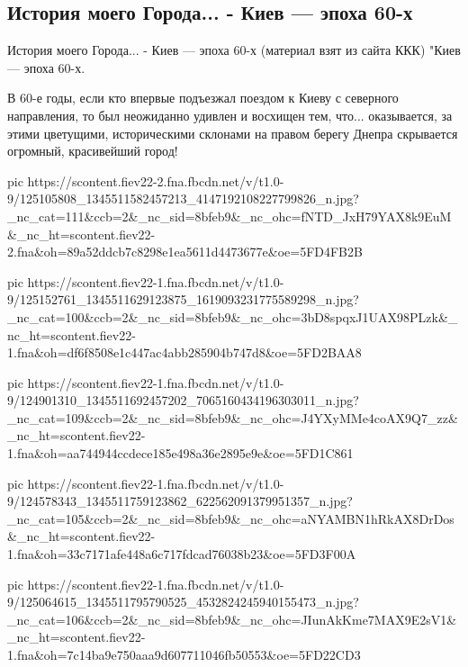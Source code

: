  
 
 

\subsection{История моего Города... - Киев --- эпоха 60-х}
\label{sec:12_11_2020.fb.evgeniy_maslov.1.kiev}


История моего Города... - Киев --- эпоха 60-х
(материал взят из сайта ККК)
"Киев --- эпоха 60-х.

В 60-е годы, если кто впервые подъезжал поездом к Киеву с северного
направления, то был неожиданно удивлен и восхищен тем, что... оказывается, за
этими цветущими, историческими склонами на правом берегу Днепра скрывается
огромный, красивейший город!

\ifcmt
pic https://scontent.fiev22-2.fna.fbcdn.net/v/t1.0-9/125105808_1345511582457213_4147192108227799826_n.jpg?_nc_cat=111&ccb=2&_nc_sid=8bfeb9&_nc_ohc=fNTD_JxH79YAX8k9EuM&_nc_ht=scontent.fiev22-2.fna&oh=89a52ddcb7c8298e1ea5611d4473677e&oe=5FD4FB2B

pic https://scontent.fiev22-1.fna.fbcdn.net/v/t1.0-9/125152761_1345511629123875_1619093231775589298_n.jpg?_nc_cat=100&ccb=2&_nc_sid=8bfeb9&_nc_ohc=3bD8spqxJ1UAX98PLzk&_nc_ht=scontent.fiev22-1.fna&oh=df6f8508e1c447ac4abb285904b747d8&oe=5FD2BAA8

pic https://scontent.fiev22-1.fna.fbcdn.net/v/t1.0-9/124901310_1345511692457202_7065160434196303011_n.jpg?_nc_cat=109&ccb=2&_nc_sid=8bfeb9&_nc_ohc=J4YXyMMe4coAX9Q7_zz&_nc_ht=scontent.fiev22-1.fna&oh=aa744944ccdece185e498a36e2895e9e&oe=5FD1C861

pic https://scontent.fiev22-1.fna.fbcdn.net/v/t1.0-9/124578343_1345511759123862_622562091379951357_n.jpg?_nc_cat=105&ccb=2&_nc_sid=8bfeb9&_nc_ohc=aNYAMBN1hRkAX8DrDos&_nc_ht=scontent.fiev22-1.fna&oh=33c7171afe448a6c717fdcad76038b23&oe=5FD3F00A

pic https://scontent.fiev22-1.fna.fbcdn.net/v/t1.0-9/125064615_1345511795790525_4532824245940155473_n.jpg?_nc_cat=106&ccb=2&_nc_sid=8bfeb9&_nc_ohc=JIunAkKme7MAX9E2sV1&_nc_ht=scontent.fiev22-1.fna&oh=7c14ba9e750aaa9d607711046fb50553&oe=5FD22CD3

